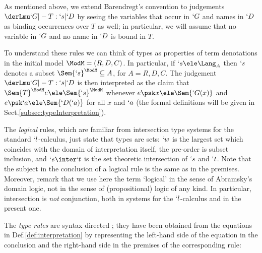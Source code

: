 \documentclass{lmcs}
\begin{document}
As mentioned above, we extend Barendregt's convention to judgements $ \derLmu `G |- T : `s | `D $ by seeing the variables that occur in $`G$ and names in $`D $ as binding occurrences over $T$ as well; in particular, we will assume that no variable in $`G$ and no name in $`D $ is bound in $T$.

To understand these rules we can think of types as properties of term denotations in the 
initial model ${\ModM} = (R,D,C)$. In particular, if $`s \ele \Lang_A$ 
then $`s$ denotes a subset $\Sem{ `s }^{\ModM} \subseteq A$, for $A = R,D,C$. 
The judgement $ \derLmu `G |- T : `s | `D $ is then interpreted as the claim
that $\Sem{ T }^{\ModM}{ e } \ele \Sem{ `s }^{\ModM}$ whenever $e\psk x \ele \Sem{`G(x)}$ and $e\psk `a \ele \Sem{`D(`a)}$ for all $x$ and $`a$ (the formal definitions will be given in Sect.\skp\ref{subsec:typeInterpretation}).

The \emph{logical} rules, which are familiar from intersection type systems for the standard $`l$-calculus, just state that types are sets: $`w$ is the largest set which coincides with the domain of interpretation itself, the pre-order is subset inclusion, and $`s\inter`t$ is the set theoretic intersection of $`s$ and $`t$. 
Note that the subject in the conclusion of a logical rule is the same as in the premises. 
Moreover, remark that we use here the term `logical' in the sense of Abramsky's domain logic, not in the sense of (propositional) logic of any kind. 
In particular, intersection is \emph{not} conjunction, both in systems for the $`l$-calculus and in the present one.

The \emph{type rules} are syntax directed%
; they have been obtained from the equations in Def.\skp\ref{def:interpretation} by representing the left-hand side of the equation in the conclusion and the right-hand side in the premises of the corresponding rule:
\end{document}
